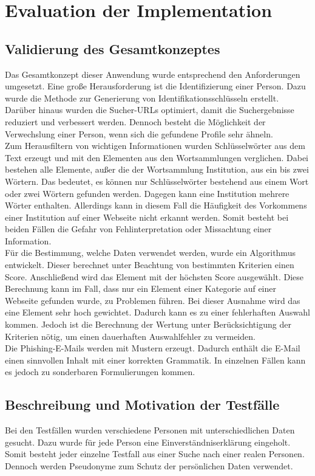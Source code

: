 

\chapter{Evaluation der Implementation}  %
\label{cha:Evaluation der Implementation} %
\section{Validierung des Gesamtkonzeptes}
Das Gesamtkonzept dieser Anwendung wurde entsprechend den Anforderungen umgesetzt. Eine große Herausforderung ist die Identifizierung einer Person. Dazu wurde die Methode zur Generierung von Identifikationsschlüsseln erstellt. Darüber hinaus wurden die Sucher-URLs optimiert, damit die Suchergebnisse reduziert und verbessert werden. Dennoch besteht die Möglichkeit der Verwechslung einer Person, wenn sich die gefundene Profile sehr ähneln.\\
Zum Herausfiltern von wichtigen Informationen wurden Schlüsselwörter aus dem Text erzeugt und mit den Elementen aus den Wortsammlungen verglichen. Dabei bestehen alle Elemente, außer die der Wortsammlung Institution, aus ein bis zwei Wörtern. Das bedeutet, es können nur Schlüsselwörter bestehend aus einem Wort oder zwei Wörtern gefunden werden. Dagegen kann eine Institution mehrere Wörter enthalten. Allerdings kann in diesem Fall die Häufigkeit des Vorkommens einer Institution auf einer Webseite nicht erkannt werden. Somit besteht bei beiden Fällen die Gefahr von Fehlinterpretation oder Missachtung einer Information.\\
Für die Bestimmung, welche Daten verwendet werden, wurde ein Algorithmus entwickelt. Dieser berechnet unter Beachtung von bestimmten Kriterien einen Score. Anschließend wird das Element mit der höchsten Score ausgewählt. Diese Berechnung kann im Fall, dass nur ein Element einer Kategorie auf einer Webseite gefunden wurde, zu Problemen führen. Bei dieser Ausnahme wird das eine Element sehr hoch gewichtet. Dadurch kann es zu einer fehlerhaften Auswahl kommen. Jedoch ist die Berechnung der Wertung unter Berücksichtigung der Kriterien nötig, um einen dauerhaften Auswahlfehler zu vermeiden.\\
Die Phishing-E-Mails werden mit Mustern erzeugt. Dadurch enthält die E-Mail einen sinnvollen Inhalt mit einer korrekten Grammatik. In einzelnen Fällen kann es jedoch zu sonderbaren Formulierungen kommen.

\section{Beschreibung und Motivation der Testfälle}
Bei den Testfällen wurden verschiedene Personen mit unterschiedlichen Daten gesucht. Dazu wurde für jede Person eine Einverständniserklärung eingeholt. Somit besteht jeder einzelne Testfall aus einer Suche nach einer realen Personen. Dennoch werden Pseudonyme zum Schutz der persönlichen Daten verwendet.
